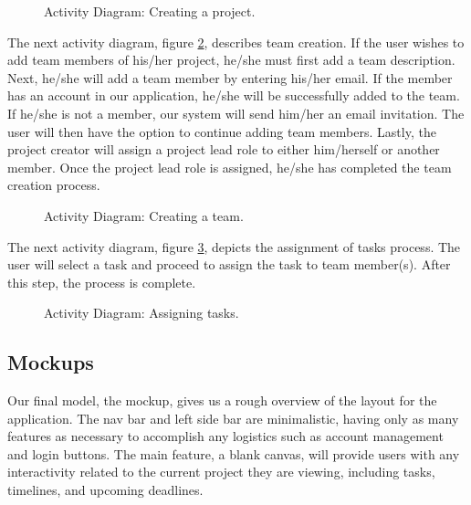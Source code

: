 \begin{figure}[ht]
\centering
{}
\caption{Activity Diagram: Creating a project.}
\label{activityOne}
\end{figure}
\FloatBarrier
\par The next activity diagram, figure \ref{activityTwo}, describes team creation. If the user wishes to add team members of his/her project, he/she must first add a team description. Next, he/she will add a team member by entering his/her email. If the member has an account in our application, he/she will be successfully added to the team. If he/she is not a member, our system will send him/her an email invitation. The user will then have the option to continue adding team members. Lastly, the project creator will assign a project lead role to either him/herself or another member. Once the project lead role is assigned, he/she has completed the team creation process. 


\begin{figure}[ht]
\centering
{}
\caption{Activity Diagram: Creating a team.}
\label{activityTwo}
\end{figure}
\FloatBarrier

\par The next activity diagram, figure \ref{activityFour}, depicts the assignment of  tasks process. The user will select a task and proceed to assign the task to team member(s). After this step, the process is complete. 

\begin{figure}[ht]
\centering
{}
\caption{Activity Diagram: Assigning tasks.}
\label{activityFour}
\end{figure}
\FloatBarrier


\subsection{Mockups}

Our final model, the mockup, gives us a rough overview of the layout for the application. The nav bar and left side bar are minimalistic, having only as many features as necessary to accomplish any logistics such as account management and login buttons. The main feature, a blank canvas, will provide users with any interactivity related to the current project they are viewing, including tasks, timelines, and upcoming deadlines. 

